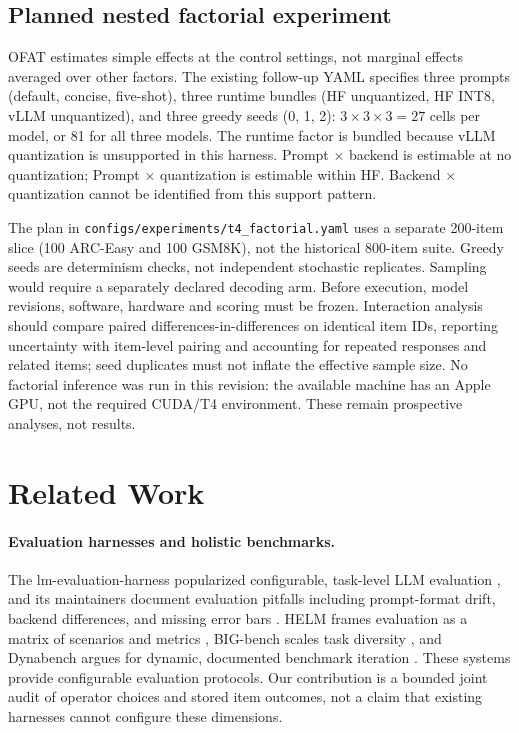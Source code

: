 \subsection{Planned nested factorial experiment}
\label{sec:factorial-plan}

OFAT estimates simple effects at the control settings, not marginal effects
averaged over other factors. The existing follow-up YAML specifies three
prompts (default, concise, five-shot), three runtime bundles (HF
unquantized, HF INT8, vLLM unquantized), and three greedy seeds (0, 1, 2):
$3\times3\times3=27$ cells per model, or 81 for all three models.
The runtime factor is bundled because vLLM quantization is unsupported in
this harness. Prompt $\times$ backend is estimable at no quantization;
Prompt $\times$ quantization is estimable within HF. Backend $\times$
quantization cannot be identified from this support pattern.

The plan in \texttt{configs/experiments/t4\_factorial.yaml} uses a separate
200-item slice (100 ARC-Easy and 100 GSM8K), not the historical 800-item
suite. Greedy seeds are determinism checks, not independent stochastic
replicates. Sampling would require a separately declared decoding arm.
Before execution, model revisions, software, hardware and scoring must be
frozen. Interaction analysis should compare paired differences-in-differences
on identical item IDs, reporting uncertainty with item-level pairing and
accounting for repeated responses and related items; seed duplicates must
not inflate the effective sample size. No factorial inference was run in
this revision: the available machine has an Apple GPU, not the required
CUDA/T4 environment. These remain prospective analyses, not results.


\section{Related Work}
\label{sec:related}

\paragraph{Evaluation harnesses and holistic benchmarks.}
The lm-evaluation-harness popularized configurable, task-level LLM
evaluation \citep{gao2021framework}, and its maintainers document evaluation
pitfalls including prompt-format drift, backend differences, and missing
error bars \citep{biderman2024lessons}. HELM frames evaluation as a matrix
of scenarios and metrics \citep{liang2022holistic}, BIG-bench scales task
diversity \citep{srivastava2022beyond}, and Dynabench argues for dynamic,
documented benchmark iteration \citep{kiela2021dynabench}. These systems provide configurable evaluation protocols. Our contribution
is a bounded joint audit of operator choices and stored item outcomes,
not a claim that existing harnesses cannot configure these dimensions.

